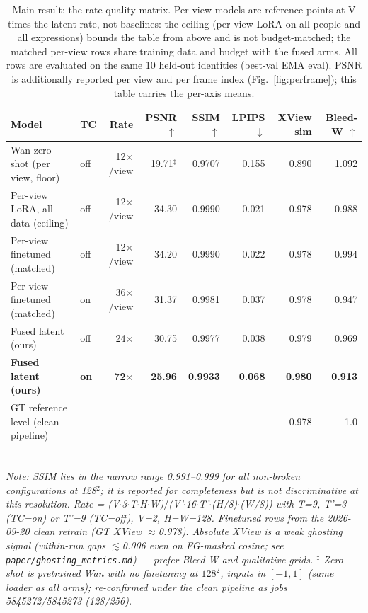 \begin{table}[t]
\centering
\caption{Main result: the rate-quality matrix. Per-view models are reference points at V times the latent rate, not baselines: the ceiling (per-view LoRA on all people and all expressions) bounds the table from above and is not budget-matched; the matched per-view rows share training data and budget with the fused arms. All rows are evaluated on the same 10 held-out identities (best-val EMA eval). PSNR is additionally reported per view and per frame index (Fig.~\ref{fig:perframe}); this table carries the per-axis means.}
\label{tab:main}
\begin{tabular}{llrrrrrr}
\toprule
Model & TC & Rate & PSNR $\uparrow$ & SSIM $\uparrow$ & LPIPS $\downarrow$ & XView sim & Bleed-W $\uparrow$ \\
\midrule
Wan zero-shot (per view, floor)      & off & 12$\times$/view & 19.71$^\ddagger$ & 0.9707 & 0.155  & 0.890 & 1.092 \\
Per-view LoRA, all data (ceiling)    & off & 12$\times$/view & 34.30       & 0.9990 & 0.021  & 0.978 & 0.988 \\
Per-view finetuned (matched)         & off & 12$\times$/view & 34.20       & 0.9990 & 0.022  & 0.978 & 0.994 \\
Per-view finetuned (matched)         & on  & 36$\times$/view & 31.37       & 0.9981 & 0.037  & 0.978 & 0.947 \\
Fused latent (ours)                  & off & 24$\times$       & 30.75       & 0.9977 & 0.038  & 0.979 & 0.969 \\
\textbf{Fused latent (ours)}         & \textbf{on}  & \textbf{72$\times$} & \textbf{25.96} & \textbf{0.9933} & \textbf{0.068} & \textbf{0.980} & \textbf{0.913} \\
\midrule
GT reference level (clean pipeline)  & --  & --              & --          & --     & --     & 0.978 & 1.0 \\
\bottomrule
\end{tabular}
\smallskip\\
\textit{Note: SSIM lies in the narrow range 0.991--0.999 for all non-broken configurations at 128$^2$; it is reported for completeness but is not discriminative at this resolution. Rate = (V$\cdot$3$\cdot$T$\cdot$H$\cdot$W)$/$(V'$\cdot$16$\cdot$T'$\cdot$(H/8)$\cdot$(W/8)) with T=9, T'=3 (TC=on) or T'=9 (TC=off), V=2, H=W=128. Finetuned rows from the 2026-09-20 clean retrain (GT XView $\approx$0.978). Absolute XView is a weak ghosting signal (within-run gaps $\lesssim$0.006 even on FG-masked cosine; see \texttt{paper/ghosting\_metrics.md}) --- prefer Bleed-W and qualitative grids. $^\ddagger$ Zero-shot is pretrained Wan with no finetuning at $128^2$, inputs in $[-1,1]$ (same loader as all arms); re-confirmed under the clean pipeline as jobs 5845272/5845273 (128/256).}
\end{table}

